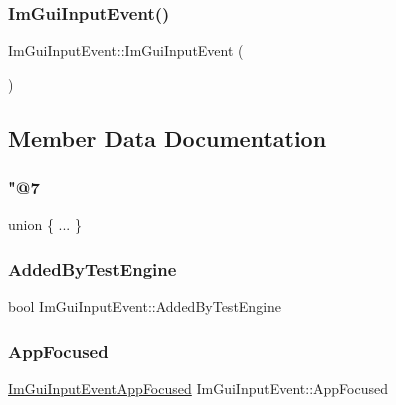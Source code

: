\subsubsection{\texorpdfstring{Im\+Gui\+Input\+Event()}{ImGuiInputEvent()}}
{\footnotesize\ttfamily Im\+Gui\+Input\+Event\+::\+Im\+Gui\+Input\+Event (\begin{DoxyParamCaption}{ }\end{DoxyParamCaption})\hspace{0.3cm}{\ttfamily [inline]}}



\subsection{Member Data Documentation}
\mbox{\label{structImGuiInputEvent_a8f1d016e48cd5366de5c25ea21fd5e46}} 
\subsubsection{\texorpdfstring{"@7}{@7}}
{\footnotesize\ttfamily union \{ ... \} }

\mbox{\label{structImGuiInputEvent_a87ff836d8c98d03adc91cdd592a13e0d}} 
\subsubsection{\texorpdfstring{Added\+By\+Test\+Engine}{AddedByTestEngine}}
{\footnotesize\ttfamily bool Im\+Gui\+Input\+Event\+::\+Added\+By\+Test\+Engine}

\mbox{\label{structImGuiInputEvent_a74fbb441887d8a49f07df0d6dac48692}} 
\subsubsection{\texorpdfstring{App\+Focused}{AppFocused}}
{\footnotesize\ttfamily \hyperlink{structImGuiInputEventAppFocused}{Im\+Gui\+Input\+Event\+App\+Focused} Im\+Gui\+Input\+Event\+::\+App\+Focused}

